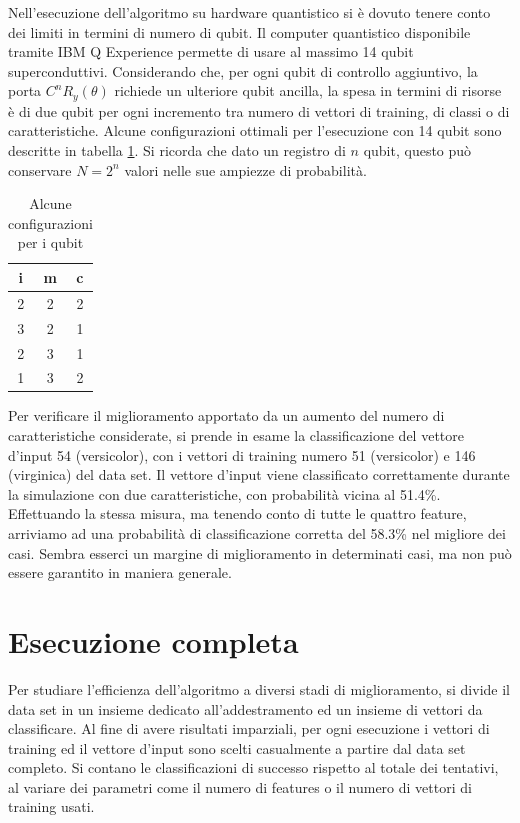 Nell'esecuzione dell'algoritmo su hardware quantistico si è dovuto tenere 
conto dei limiti in termini di numero di qubit. Il computer quantistico 
disponibile tramite IBM Q Experience permette di usare al massimo 
14 qubit superconduttivi. Considerando che, per ogni qubit di controllo aggiuntivo, 
la porta $C^n R_y (\theta)$ richiede un ulteriore qubit ancilla, la spesa 
in termini di risorse è di due qubit per ogni incremento tra numero di vettori 
di training, di classi o di caratteristiche. Alcune configurazioni ottimali 
per l'esecuzione con 14 qubit sono descritte in tabella \ref{table:conf.ottimali}. 
Si ricorda che dato un registro di $n$ qubit, questo può conservare $N=2^n$ 
valori nelle sue ampiezze di probabilità. 

\begin{table}[h!]
    \centering
    \begin{tabular}{c c c}
        i & m & c \\ 
        \hline
        2 & 2 & 2 \\ 
        3 & 2 & 1 \\ 
        2 & 3 & 1 \\ 
        1 & 3 & 2
    \end{tabular}
    \caption{Alcune configurazioni per i qubit}
    \label{table:conf.ottimali}
\end{table}


Per verificare il miglioramento apportato da un aumento del numero di caratteristiche 
considerate, si prende in esame la classificazione del vettore d'input 54 (versicolor), 
con i vettori di training numero 51 (versicolor) e 146 (virginica) del data set. 
Il vettore d'input viene classificato correttamente durante la simulazione con due caratteristiche, 
con probabilità vicina al 51.4\%. 
Effettuando la stessa misura, ma tenendo conto di tutte le quattro feature, arriviamo ad 
una probabilità di classificazione corretta del 58.3\% nel migliore dei casi. 
Sembra esserci un margine di miglioramento in determinati casi, 
ma non può essere garantito in maniera generale. 

\section{Esecuzione completa}

Per studiare l'efficienza dell'algoritmo a diversi stadi di miglioramento, 
si divide il data set in un insieme dedicato all'addestramento ed un insieme 
di vettori da classificare. Al fine di avere risultati imparziali, 
per ogni esecuzione i vettori di training ed il vettore d'input 
sono scelti casualmente a partire dal data set completo. 
Si contano le classificazioni di successo 
rispetto al totale dei tentativi, al variare dei parametri come il numero 
di features o il numero di vettori di training usati. 

